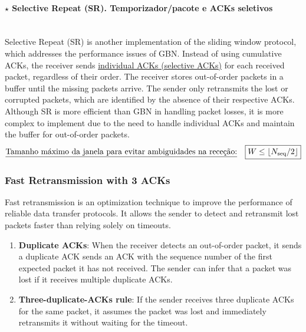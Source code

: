 \paragraph[3.4.3.3 Selective Repeat (SR). Temporizador/pacote e ACKs seletivos]{$\pmb{\star}$ Selective Repeat (SR). Temporizador/pacote e ACKs seletivos}\mbox{}\\[4pt]
Selective Repeat (SR) is another implementation of the sliding window protocol, which addresses the performance issues of GBN. Instead of using cumulative ACKs, the receiver sends \underline{individual ACKs (selective ACKs)} for each received packet, regardless of their order. The receiver stores out-of-order packets in a buffer until the missing packets arrive. The sender only retransmits the lost or corrupted packets, which are identified by the absence of their respective ACKs. Although SR is more efficient than GBN in handling packet losses, it is more complex to implement due to the need to handle individual ACKs and maintain the buffer for out-of-order packets.
$$
    \text{\underline{Tamanho máximo da janela para evitar ambiguidades na receção:}} \quad \boxed{W \leq \left\lfloor N_\text{seq}/2 \right\rfloor}
$$

\subsubsection[3.4.4 Fast Retransmission with 3 ACKs]{\hspace*{0.075 em}\raisebox{0.2 em}{$\pmb{\rightarrow}$} Fast Retransmission with 3 ACKs}
\label{subsec:fast-retransmission}

Fast retransmission is an optimization technique to improve the performance of reliable data transfer protocols. It allows the sender to detect and retransmit lost packets faster than relying solely on timeouts.

\vspace{-0.5em}
\begin{enumerate}
    \item \textbf{Duplicate ACKs}: When the receiver detects an out-of-order packet, it sends a duplicate ACK sends an ACK with the sequence number of the first expected packet it has not received. The sender can infer that a packet was lost if it receives multiple duplicate ACKs.
    
    \item \textbf{Three-duplicate-ACKs rule}: If the sender receives three duplicate ACKs for the same packet, it assumes the packet was lost and immediately retransmits it without waiting for the timeout.
\end{enumerate}


